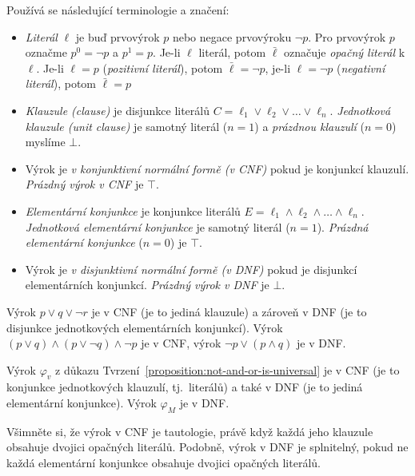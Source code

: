 Používá se následující terminologie a značení:
\begin{itemize}
    \item \emph{Literál} $\ell$ je buď prvovýrok $p$ nebo negace prvovýroku $\neg p$. Pro prvovýrok $p$ označme $p^0=\neg p$ a $p^1=p$. Je-li $\ell$ literál, potom $\bar \ell$ označuje \emph{opačný literál} k $\ell$. Je-li $\ell=p$ (\emph{pozitivní literál}), potom $\bar \ell=\neg p$, je-li $\ell=\neg p$ (\emph{negativní literál}), potom $\bar \ell=p$
    \item \emph{Klauzule (clause)} je disjunkce literálů $C=\ell_1\lor\ell_2\lor\dots\lor\ell_n$. \emph{Jednotková klauzule (unit clause)} je samotný literál ($n=1$) a \emph{prázdnou klauzulí} ($n=0$) myslíme $\bot$.
    \item Výrok je \emph{v konjunktivní normální formě (v CNF)} pokud je konjunkcí klauzulí. \emph{Prázdný výrok v CNF} je $\top$.
    \item \emph{Elementární konjunkce} je konjunkce literálů $E=\ell_1\land\ell_2\land\dots\land\ell_n$. \emph{Jednotková elementární konjunkce} je samotný literál ($n=1$). \emph{Prázdná elementární konjunkce} ($n=0$) je $\top$.
    \item Výrok je \emph{v disjunktivní normální formě (v DNF)} pokud je disjunkcí elementárních konjunkcí. \emph{Prázdný výrok v DNF} je $\bot$.
\end{itemize}

\begin{example}
    Výrok ${{p\lor q}\lor\neg r}$ je v CNF (je to jediná klauzule) a zároveň v DNF (je to disjunkce jednotkových elementárních konjunkcí). Výrok $(p\lor q)\land (p\lor \neg q)\land \neg p$ je v CNF, výrok $\neg p\lor (p\land q)$ je v DNF.
\end{example}

\begin{example}
    Výrok $\varphi_v$ z důkazu Tvrzení~\ref{proposition:not-and-or-is-universal} je v CNF (je to konjunkce jednotkových klauzulí, tj.\ literálů) a také v DNF (je to jediná elementární konjunkce). Výrok $\varphi_M$ je v DNF.
\end{example}

\begin{observation}
Všimněte si, že výrok v CNF je tautologie, právě když každá jeho klauzule obsahuje dvojici opačných literálů. Podobně, výrok v DNF je splnitelný, pokud ne každá elementární konjunkce obsahuje dvojici opačných literálů.
\end{observation}

